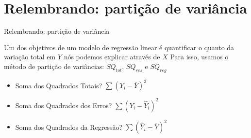 \documentclass{beamer}\usepackage[]{graphicx}\usepackage[]{color}
\begin{document}
\section{Relembrando: partição de variância}


\begin{frame}{Relembrando: partição de variância}

Um dos objetivos de um modelo de regressão linear é quantificar o quanto da variação total em $Y$ nós podemos explicar através de $X$
\vfill
Para isso, usamos o método de partição de variâncias: $SQ_{tot}$, $SQ_{res}$ e $SQ_{reg}$
\vfill
\begin{itemize}
  \item Soma dos Quadrados Totais? \pause $\sum(Y_i-\bar Y)^2$ \pause
  \vfill
  \item Soma dos Quadrados dos Erros? \pause $\sum(Y_i-\hat Y_i)^2$ \pause
  \vfill
  \item Soma dos Quadrados da Regressão? \pause $\sum(\hat Y_i - \bar Y)^2$
\end{itemize}

\end{frame}
\end{document}

